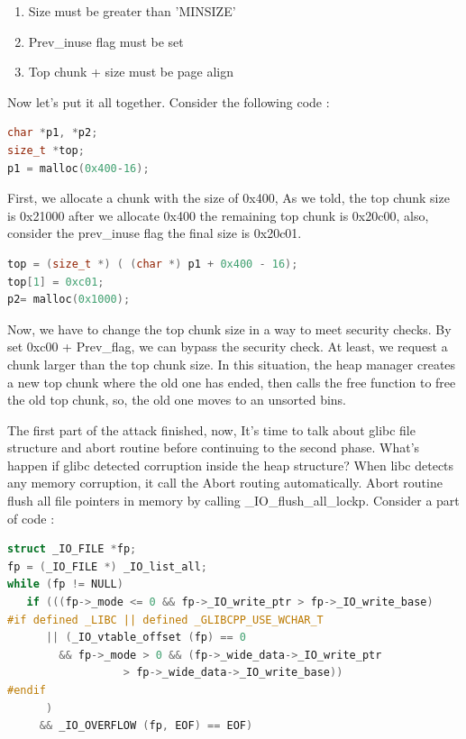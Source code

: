\documentclass{masterthesis}
\newcommand*\libc{glibc}
\newcommand*\ub{unsorted bins}
\begin{document}
\begin{enumerate}
	\item Size must be greater than 'MINSIZE'
	\item Prev\_inuse flag must be set
	\item Top chunk + size must be page align
\end{enumerate}

Now let's put it all together. Consider the following code :

\begin{lstlisting}[language=c,frame=tlrb]
char *p1, *p2;
size_t *top;
p1 = malloc(0x400-16);
 \end{lstlisting}

First, we allocate a chunk with the size of 0x400, As we told, the top chunk size is 0x21000 after we allocate 0x400 the remaining top chunk is 0x20c00, also, consider the prev\_inuse flag the final size is 0x20c01.

\begin{lstlisting}[language=c,frame=tlrb]
top = (size_t *) ( (char *) p1 + 0x400 - 16);
top[1] = 0xc01;
p2= malloc(0x1000); 
\end{lstlisting}

Now, we have to change the top chunk size in a way to meet security checks. By set 0xc00 + Prev\_flag, we can bypass the security check. At least, we request a chunk larger than the top chunk size. In this situation, the heap manager creates a new top chunk where the old one has ended, then calls the free function to free the old top chunk, so, the old one moves to an \ub{}. 

The first part of the attack finished, now, It's time to talk about \libc{} file structure and abort routine before continuing to the second phase. What's happen if \libc{} detected corruption inside the heap structure? When libc detects any memory corruption, it call the Abort routing automatically. Abort routine flush all file pointers in memory by calling \_IO\_flush\_all\_lockp. Consider a part of code : 

\begin{lstlisting}[language=c,frame=tlrb]
struct _IO_FILE *fp;
fp = (_IO_FILE *) _IO_list_all;
while (fp != NULL)
   if (((fp->_mode <= 0 && fp->_IO_write_ptr > fp->_IO_write_base)
#if defined _LIBC || defined _GLIBCPP_USE_WCHAR_T
	  || (_IO_vtable_offset (fp) == 0
	    && fp->_mode > 0 && (fp->_wide_data->_IO_write_ptr
				  > fp->_wide_data->_IO_write_base))
#endif
	  )
	 && _IO_OVERFLOW (fp, EOF) == EOF)
\end{lstlisting}
\end{document}
